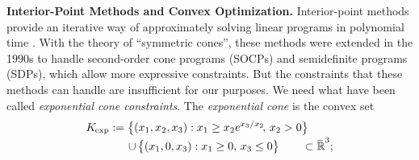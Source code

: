 %
\textbf{Interior-Point Methods and Convex Optimization.}
%
Interior-point methods provide an iterative way of approximately solving linear programs in polynomial time \parencite{karmarkar1984new}.
With the theory of ``symmetric cones'', these methods were extended in the 1990s to handle second-order cone programs (SOCPs) and semidefinite programs (SDPs), which allow more expressive constraints.
But the constraints that these methods can handle are insufficient for
our purposes. We need what have been called \emph{exponential cone constraints}.
%
The \emph{exponential cone} is the convex set
\begin{align*}
        \begin{aligned}
        K_{\mskip-1mu\exp} :=
        \big\{ (x_1, x_2, x_3) &:
                x_1 \ge x_2 e^{x_3 / x_2}\!,\, x_2 > 0 \big\}
            \\[-0.4ex]\quad \mathbin{\cup}\,
        \big\{ (x_1, 0, x_3&) : x_1 \ge 0,\, x_3 \le 0 \big\}
        \qquad \subset \mathbb {\mskip1mu\overline{\mskip-1mu\mathbb R\!}\,}^3;
    \end{aligned}
\end{align*}
